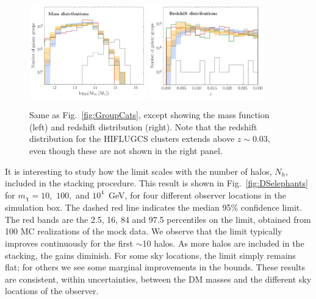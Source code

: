 \begin{figure}[htb]
   \centering
   \includegraphics[width=0.45\textwidth]{ch-darksky/plots//cat_masses.pdf}
     \includegraphics[width=0.45\textwidth]{ch-darksky/plots//cat_redshifts.pdf}    
   \caption{Same as Fig.~\ref{fig:GroupCats}, except showing the mass function (left) and redshift distribution (right).  Note that the redshift distribution for the HIFLUGCS clusters extends above $z\sim0.03$, even though these are not shown in the right panel.     }
   \label{fig:GroupCatsMZ}
\end{figure}
  
It is interesting to study how the limit scales with the number of halos, $N_h$, included in the stacking procedure.  This result is shown in Fig.~\ref{fig:DSelephants} for $m_\chi = 10,$ $100,$ and $10^4$~GeV, for four different observer locations in the simulation box.  The dashed red line indicates the median 95\% confidence limit. The red bands are the 2.5, 16, 84 and 97.5 percentiles on the limit, obtained from 100 MC realizations of the mock data.  We observe that the limit typically improves continuously for the first $\sim$10 halos.  As more halos are included in the stacking, the gains diminish.  For some sky locations, the limit simply remains flat; for others we see some marginal improvements in the bounds.  These results are consistent, within uncertainties, between the DM masses and the different sky locations of the observer. 

